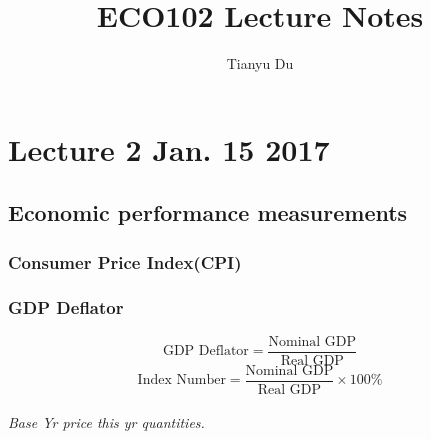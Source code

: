 \documentclass{article}
\author{Tianyu Du}
\title{ECO102 Lecture Notes}
\begin{document}
	\maketitle
	\doclicenseThis
	\tableofcontents

	\section{Lecture 2 Jan. 15 2017}

	\subsection{Economic performance measurements}
		\subsubsection{Consumer Price Index(CPI)}
		\subsubsection{GDP Deflator}
			\[
			\text{GDP Deflator} = \frac{\text{Nominal GDP}}{\text{Real GDP}}
			\]
			\[
			\text{Index Number} = \frac{\text{Nominal GDP}}{\text{Real GDP}} \times 100 \%
			\]
			\paragraph{}\emph{Base Yr price this yr quantities.}
\end{document}
